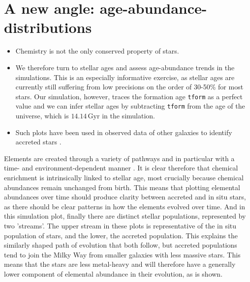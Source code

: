 \documentclass[fleqn,usenatbib]{mnras}
\begin{document}
\section{A new angle: age-abundance-distributions}

\begin{itemize}
    \item Chemistry is not the only conserved property of stars.
    \item We therefore turn to stellar ages and assess age-abundance trends in the simulations. This is an especially informative exercise, as stellar ages are currently still suffering from low precisions on the order of 30-50\% for most stars. Our simulation, however, traces the formation age \texttt{tform} as a perfect value and we can infer stellar ages by subtracting \texttt{tform} from the age of the universe, which is $14.14\,\mathrm{Gyr}$ in the simulation.
    \item Such plots have been used in observed data of other galaxies to identify accreted stars \citep{Martig2021}.
\end{itemize}

Elements are created through a variety of pathways and in particular with a time- and environment-dependent manner \citep{Kobayashi2020}. It is clear therefore that chemical enrichment is intrinsically linked to stellar age, most crucially because chemical abundances remain unchanged from birth. This means that plotting elemental abundances over time should produce clarity between accreted and in situ stars, as there should be clear patterns in how the elements evolved over time.  And in this simulation plot, finally there are distinct stellar populations, represented by two 'streams'. The upper stream in these plots is representative of the in situ population of stars, and the lower, the accreted population. This explains the similarly shaped path of evolution that both follow, but accreted populations tend to join the Milky Way from smaller galaxies with less massive stars. This means that the stars are less metal-heavy and will therefore have a generally lower component of elemental abundance in their evolution, as is shown.  
\end{document}
